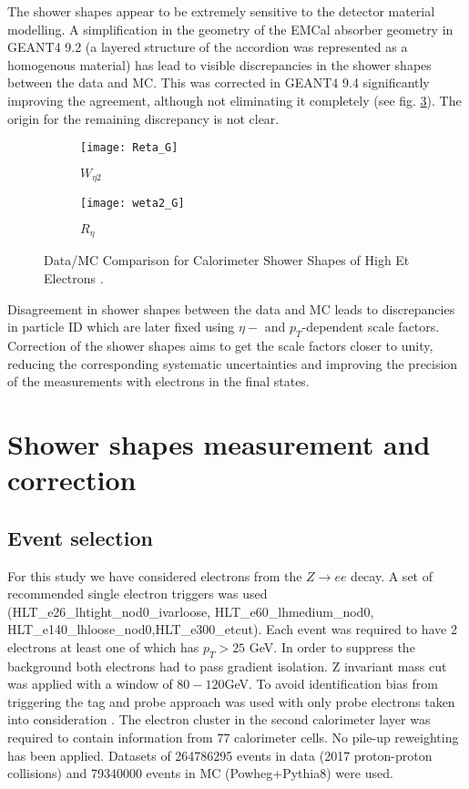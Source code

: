    The shower shapes appear to be extremely sensitive to the detector material modelling. A simplification in the geometry of the EMCal absorber geometry in GEANT4 9.2 (a layered structure of the accordion was represented as a homogenous material) has lead to visible discrepancies in the shower shapes between the data and MC. This was corrected in GEANT4 9.4 significantly improving the agreement, although not eliminating it completely (see fig. \ref{fig::sshapes_geant}).  The origin for the remaining discrepancy is not clear.\\
      	\begin{figure}[htbp]
  	\begin{subfigure}[t]{0.4\textwidth}
  		\texttt{[image: Reta\_G]}
  		\caption[ $W_{\eta 2}$]{$W_{\eta 2}$}
  		\label{fig::weta2_geant}
  	\end{subfigure}
  	\hfill
  	\begin{subfigure}[t]{0.4\textwidth} 
  		\texttt{[image: weta2\_G]}
  		\caption[ $R_{\eta}$]{$R_{\eta}$ }
  		\label{fig::reta_geant}
  	\end{subfigure}
  	\caption{Data/MC Comparison for Calorimeter Shower Shapes of High Et Electrons \cite{geant_corr}.}
  	\label{fig::sshapes_geant}
  \end{figure}
  
  Disagreement in shower shapes between the data and MC leads to discrepancies in particle ID which are later fixed using $\eta-$ and $p_T$-dependent scale factors. Correction of the shower shapes aims to get the scale factors closer to unity, reducing the corresponding systematic uncertainties and improving the precision of the measurements with electrons in the final states.  

  
  \section{ Shower shapes measurement and correction  }
  \subsection{Event selection}
  For this study we have considered electrons from the $Z\rightarrow ee$ decay. A set of recommended single electron triggers was used (HLT\_e26\_lhtight\_nod0\_ivarloose, HLT\_e60\_lhmedium\_nod0,\\
   HLT\_e140\_lhloose\_nod0,HLT\_e300\_etcut). Each event was required to have 2 electrons at least one of which has $p_T>25$ GeV.  In order to suppress the background both electrons had to pass gradient isolation. Z invariant mass cut was applied with a window of $80-120$GeV. To avoid identification bias from triggering the tag and probe approach was used with only probe electrons taken into consideration \cite{RecoID2011}. The electron cluster in the second calorimeter layer was required to contain information from 77 calorimeter cells. No pile-up reweighting has been applied. Datasets of 264786295 events in data (2017 proton-proton collisions) and 79340000 events in MC (Powheg+Pythia8) were used. 
